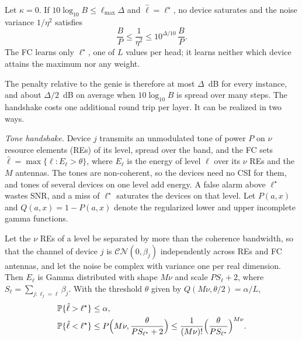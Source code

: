 \begin{proposition}\label{prop:ladder}
Let $\kappa=0$. If $10\log_{10}B\le\ell_{\max}\Delta$ and $\hat\ell=\ell^\star$, no device saturates and the noise variance $1/\eta^2$ satisfies
\begin{equation}
\frac{B}{P}\le\frac{1}{\eta^2}\le10^{\Delta/10}\,\frac{B}{P}.
\label{eq:ladder_gap}
\end{equation}
The FC learns only $\ell^\star$, one of $L$ values per head; it learns neither which device attains the maximum nor any weight.
\end{proposition}

The penalty relative to the genie is therefore at most $\Delta$~dB for every instance, and about $\Delta/2$~dB on average when $10\log_{10}B$ is spread over many steps. The handshake costs one additional round trip per layer. It can be realized in two ways.

\emph{Tone handshake.} Device $j$ transmits an unmodulated tone of power $P$ on $\nu$ resource elements (REs) of its level, spread over the band, and the FC sets $\hat\ell=\max\{\ell:E_\ell>\theta\}$, where $E_\ell$ is the energy of level $\ell$ over its $\nu$ REs and the $M$ antennas. The tones are non-coherent, so the devices need no CSI for them, and tones of several devices on one level add energy. A false alarm above $\ell^\star$ wastes SNR, and a miss of $\ell^\star$ saturates the devices on that level. Let $P(a,x)$ and $Q(a,x)=1-P(a,x)$ denote the regularized lower and upper incomplete gamma functions.

\begin{proposition}\label{prop:detection}
Let the $\nu$ REs of a level be separated by more than the coherence bandwidth, so that the channel of device $j$ is $\mathcal{CN}(0,\beta_j)$ independently across REs and FC antennas, and let the noise be complex with variance one per real dimension. Then $E_\ell$ is Gamma distributed with shape $M\nu$ and scale $P S_\ell+2$, where $S_\ell=\sum_{j:\ell_j=\ell}\beta_j$. With the threshold $\theta$ given by $Q(M\nu,\theta/2)=\alpha/L$,
\begin{align}
\mathbb{P}\{\hat\ell>\ell^\star\}&\le\alpha,\\
\mathbb{P}\{\hat\ell<\ell^\star\}&\le P\Big(M\nu,\frac{\theta}{PS_{\ell^\star}+2}\Big)\le\frac{1}{(M\nu)!}\Big(\frac{\theta}{PS_{\ell^\star}}\Big)^{M\nu}.
\label{eq:miss}
\end{align}
\end{proposition}

